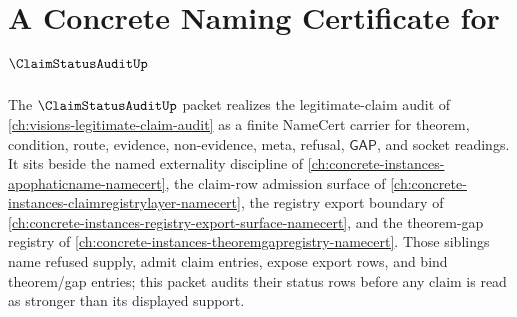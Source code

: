 \chapter{A Concrete Naming Certificate for $\ClaimStatusAuditUp$}
\label{ch:concrete-instances-claim-status-audit-namecert}

The $\ClaimStatusAuditUp$ packet realizes the legitimate-claim audit of \autoref{ch:visions-legitimate-claim-audit} as a finite NameCert carrier for theorem, condition, route, evidence, non-evidence, meta, refusal, $\mathsf{GAP}$, and socket readings. It sits beside the named externality discipline of \autoref{ch:concrete-instances-apophaticname-namecert}, the claim-row admission surface of \autoref{ch:concrete-instances-claimregistrylayer-namecert}, the registry export boundary of \autoref{ch:concrete-instances-registry-export-surface-namecert}, and the theorem-gap registry of \autoref{ch:concrete-instances-theoremgapregistry-namecert}. Those siblings name refused supply, admit claim entries, expose export rows, and bind theorem/gap entries; this packet audits their status rows before any claim is read as stronger than its displayed support.

